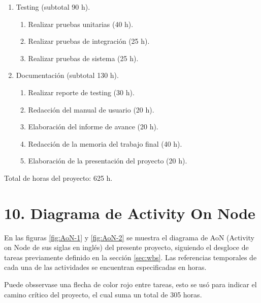 \documentclass[
11pt, %
codirector, %
]{charter}
\begin{document}
\begin{enumerate}
\begin{enumerate}
\begin{enumerate}
		\end{enumerate}
		
	\end{enumerate}
	
\item Testing (subtotal 90 h).
	\begin{enumerate}
	\item Realizar pruebas unitarias (40 h).
	\item Realizar pruebas de integración (25 h).
	\item Realizar pruebas de sistema (25 h).
	\end{enumerate}
	
\item Documentación (subtotal 130 h).
	\begin{enumerate}
	\item Realizar reporte de testing (30 h).
	\item Redacción del manual de usuario (20 h).
	\item Elaboración del informe de avance (20 h).
	\item Redacción de la memoria del trabajo final (40 h).
	\item Elaboración de la presentación del proyecto (20 h).
	\end{enumerate}
	
\end{enumerate}

Total de horas del proyecto: 625 h.

\section{10. Diagrama de Activity On Node}
\label{sec:AoN}

En las figuras \ref{fig:AoN-1} y \ref{fig:AoN-2} se muestra el diagrama de AoN (Activity on Node de sus siglas en inglés) del presente proyecto, siguiendo el desgloce de tareas previamente definido en la sección \ref{sec:wbs}. Las referencias temporales de cada una de las actividades se encuentran especificadas en horas. 

Puede obsservase una flecha de color rojo entre tareas, esto se usó para indicar el camino crítico del proyecto, el cual suma un total de 305 horas.
\end{document}
